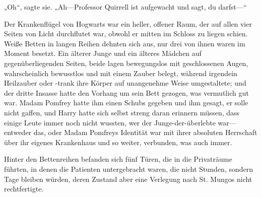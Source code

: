 „Oh“, sagte sie. „Ah—Professor Quirrell ist aufgewacht und sagt, du darfst—“

\later

Der Krankenflügel von Hogwarts war ein heller, offener Raum, der auf allen vier Seiten von Licht durchflutet war, obwohl er mitten im Schloss zu liegen schien. Weiße Betten in langen Reihen dehnten sich aus, nur drei von ihnen waren im Moment besetzt. Ein älterer Junge und ein älteres Mädchen auf gegenüberliegenden Seiten, beide lagen bewegungslos mit geschlossenen Augen, wahrscheinlich bewusstlos und mit einem Zauber belegt, während irgendein Heilzauber oder -trank ihre Körper auf unangenehme Weise umgestaltete; und der dritte Insasse hatte den Vorhang um sein Bett gezogen, was vermutlich gut war. Madam Pomfrey hatte ihm einen Schubs gegeben und ihm gesagt, er solle nicht gaffen, und Harry hatte sich selbst streng daran erinnern müssen, dass einige Leute immer noch nicht wussten, wer der Junge-der-überlebte war—entweder das, oder Madam Pomfreys Identität war mit ihrer absoluten Herrschaft über ihr eigenes Krankenhaus und so weiter, verbunden, was auch immer.

Hinter den Bettenreihen befanden sich fünf Türen, die in die Privaträume führten, in denen die Patienten untergebracht waren, die nicht Stunden, sondern Tage bleiben würden, deren Zustand aber eine Verlegung nach St. Mungos nicht rechtfertigte.

